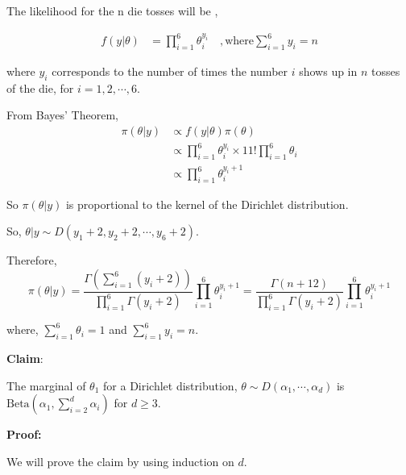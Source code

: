 \documentclass[a4paper]{article}
\begin{document}
The likelihood for the n die tosses will be ,

\begin{align*}
    f(y|\theta) &= \prod_{i=1}^{6} \theta_i^{y_i} \quad ,\text{where} \sum_{i=1}^{6} y_i = n
\end{align*}

where \(y_i\) corresponds to the number of times the number \(i\) shows up in \(n\) tosses of the die, for \(i = 1,2, \cdots, 6\).

From Bayes' Theorem,
\begin{align*}
    \pi(\theta|y) &\propto f(y|\theta) \pi(\theta)\\
    &\propto \prod_{i=1}^{6} \theta_i^{y_i} \times 11! \prod_{i=1}^{6} \theta_i\\
    &\propto \prod_{i=1}^{6} \theta_i^{y_i + 1}
\end{align*}

So \(\pi(\theta|y)\) is proportional to the kernel of the Dirichlet distribution. 

\noindent So, \(\theta|y \sim D(y_1+2,y_2+2, \cdots, y_6+2)\).

Therefore,
\[
    \pi(\theta|y) = \frac{\Gamma\left(\sum_{i=1}^{6} (y_i + 2)\right)}{\prod_{i=1}^{6} \Gamma(y_i +2)} \prod_{i=1}^{6} \theta_i^{y_i + 1}
    = \frac{\Gamma\left(n+12\right)}{\prod_{i=1}^{6} \Gamma(y_i +2)} \prod_{i=1}^{6} \theta_i^{y_i + 1}
\]

where, \(\sum_{i=1}^{6} \theta_i = 1\) and \(\sum_{i=1}^{6} y_i = n\).

\noindent \textbf{Claim}: 

The marginal of \(\theta_1\) for a Dirichlet distribution, \(\theta \sim D(\alpha_1,\cdots,\alpha_d)\) is \(\text{Beta}\left(\alpha_1,\sum_{i=2}^{d} \alpha_i\right)\) for \(d \geq 3\).

\noindent \textbf{Proof:}

We will prove the claim by using induction on \(d\).
\end{document}
